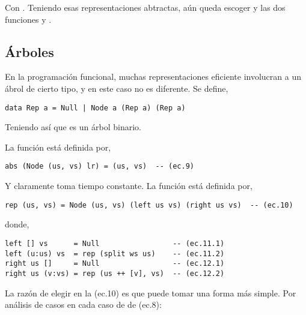 Con . Teniendo esas representaciones
abtractas, aún queda escoger  y las dos funciones  y .

\subsection{Árboles}
En la programación funcional, muchas representaciones eficiente involucran a un ábrol de cierto
tipo, y en este caso no es diferente. Se define,
\begin{verbatim}
data Rep a = Null | Node a (Rep a) (Rep a)
\end{verbatim}

Teniendo así que  es un árbol binario.

La función  está definida por,
\begin{verbatim}
abs (Node (us, vs) lr) = (us, vs)  -- (ec.9)
\end{verbatim}

Y claramente toma tiempo constante. La función  está definida por,

\begin{verbatim}
rep (us, vs) = Node (us, vs) (left us vs) (right us vs)  -- (ec.10)
\end{verbatim}

donde,
\begin{verbatim}
left [] vs      = Null                 -- (ec.11.1)
left (u:us) vs  = rep (split ws us)    -- (ec.11.2)
right us []     = Null                 -- (ec.12.1)
right us (v:vs) = rep (us ++ [v], vs)  -- (ec.12.2)
\end{verbatim}

La razón de elegir  en la (ec.10) es que  puede tomar una forma más simple.
Por análisis de casos en cada caso de  de (ec.8):

